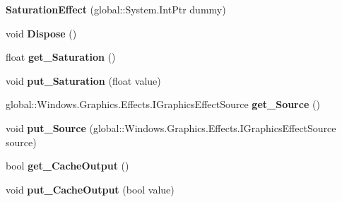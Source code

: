 \begin{DoxyCompactItemize}
{\bfseries Saturation\+Effect} (global\+::\+System.\+Int\+Ptr dummy)
\item 
\mbox{\label{class_microsoft_1_1_graphics_1_1_canvas_1_1_effects_1_1_saturation_effect_abc0ee958e63fe41d70f099e8606db15a}} 
void {\bfseries Dispose} ()
\item 
\mbox{\label{class_microsoft_1_1_graphics_1_1_canvas_1_1_effects_1_1_saturation_effect_a6e0d403f8b1765e184055fa4f30f9d37}} 
float {\bfseries get\+\_\+\+Saturation} ()
\item 
\mbox{\label{class_microsoft_1_1_graphics_1_1_canvas_1_1_effects_1_1_saturation_effect_a7befcf53c9ea4a4ca617f8ccaec53562}} 
void {\bfseries put\+\_\+\+Saturation} (float value)
\item 
\mbox{\label{class_microsoft_1_1_graphics_1_1_canvas_1_1_effects_1_1_saturation_effect_afdaaa78102ee494a25fbe75735104301}} 
global\+::\+Windows.\+Graphics.\+Effects.\+I\+Graphics\+Effect\+Source {\bfseries get\+\_\+\+Source} ()
\item 
\mbox{\label{class_microsoft_1_1_graphics_1_1_canvas_1_1_effects_1_1_saturation_effect_ac829b5a4bcc5e71e4c3416214d974fd6}} 
void {\bfseries put\+\_\+\+Source} (global\+::\+Windows.\+Graphics.\+Effects.\+I\+Graphics\+Effect\+Source source)
\item 
\mbox{\label{class_microsoft_1_1_graphics_1_1_canvas_1_1_effects_1_1_saturation_effect_a4b5e5447d01ddec7e99150c6fbc2ed92}} 
bool {\bfseries get\+\_\+\+Cache\+Output} ()
\item 
\mbox{\label{class_microsoft_1_1_graphics_1_1_canvas_1_1_effects_1_1_saturation_effect_a5af768a577277d5763f0ea767eaaf071}} 
void {\bfseries put\+\_\+\+Cache\+Output} (bool value)
\item 

\end{DoxyCompactItemize}
